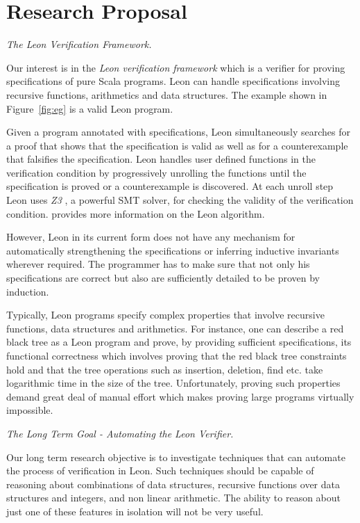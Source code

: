 \section{Research Proposal}

\emph{The Leon Verification Framework.}

Our interest is in the \emph{Leon verification framework} \cite{psuter:SAS11} which 
is a verifier for proving specifications of pure Scala programs. 
Leon can handle specifications involving recursive functions, arithmetics and data structures. The example shown in Figure~\ref{fig:eg} is a valid Leon program.  

Given a program annotated with specifications, Leon simultaneously searches for a proof that shows that the specification is valid as well as for a counterexample that falsifies the specification.
Leon handles user defined functions in the verification condition by progressively unrolling the functions until the specification is proved or a counterexample is discovered. 
At each unroll step Leon uses \emph{Z3} \cite{moura:ACM11}, a powerful SMT solver, for checking the validity of the verification condition. 
\cite{psuter:SAS11} provides more information on the Leon algorithm.

However, Leon in its current form  does not have any mechanism for automatically strengthening the specifications or inferring inductive invariants wherever 
required. The programmer has to make sure that not only his specifications are correct but also are sufficiently detailed to be proven by induction.

Typically, Leon programs specify complex properties that involve recursive functions, data structures and arithmetics. For instance, one can describe a red black tree as a Leon program and prove, by providing sufficient specifications, its functional correctness which involves proving that the red black tree constraints hold and that the tree operations such as insertion, deletion, find etc. take logarithmic time in the size of the tree.
Unfortunately, proving such properties demand great deal of manual effort which makes proving large programs virtually impossible.

\emph{The Long Term Goal - Automating the Leon Verifier.}

Our long term research objective is to investigate techniques that can automate the process of verification in Leon. Such techniques should be capable of reasoning about combinations of data structures, recursive functions over data structures and integers, and non linear arithmetic. The ability to reason about just one of these features in isolation will not be very useful. 

